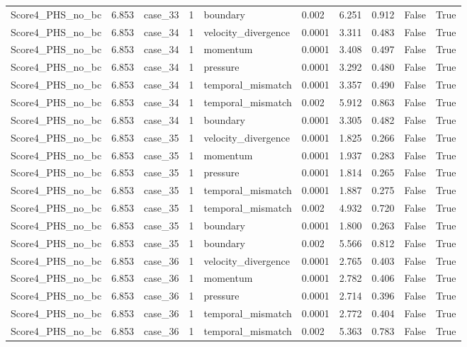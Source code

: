 \begin{longtable}{llllllllll}
Score4\_PHS\_no\_bc & 6.853 & case\_33 & 1 & boundary & 0.002 & 6.251 & 0.912 & False & True \\
Score4\_PHS\_no\_bc & 6.853 & case\_34 & 1 & velocity\_divergence & 0.0001 & 3.311 & 0.483 & False & True \\
Score4\_PHS\_no\_bc & 6.853 & case\_34 & 1 & momentum & 0.0001 & 3.408 & 0.497 & False & True \\
Score4\_PHS\_no\_bc & 6.853 & case\_34 & 1 & pressure & 0.0001 & 3.292 & 0.480 & False & True \\
Score4\_PHS\_no\_bc & 6.853 & case\_34 & 1 & temporal\_mismatch & 0.0001 & 3.357 & 0.490 & False & True \\
Score4\_PHS\_no\_bc & 6.853 & case\_34 & 1 & temporal\_mismatch & 0.002 & 5.912 & 0.863 & False & True \\
Score4\_PHS\_no\_bc & 6.853 & case\_34 & 1 & boundary & 0.0001 & 3.305 & 0.482 & False & True \\
Score4\_PHS\_no\_bc & 6.853 & case\_35 & 1 & velocity\_divergence & 0.0001 & 1.825 & 0.266 & False & True \\
Score4\_PHS\_no\_bc & 6.853 & case\_35 & 1 & momentum & 0.0001 & 1.937 & 0.283 & False & True \\
Score4\_PHS\_no\_bc & 6.853 & case\_35 & 1 & pressure & 0.0001 & 1.814 & 0.265 & False & True \\
Score4\_PHS\_no\_bc & 6.853 & case\_35 & 1 & temporal\_mismatch & 0.0001 & 1.887 & 0.275 & False & True \\
Score4\_PHS\_no\_bc & 6.853 & case\_35 & 1 & temporal\_mismatch & 0.002 & 4.932 & 0.720 & False & True \\
Score4\_PHS\_no\_bc & 6.853 & case\_35 & 1 & boundary & 0.0001 & 1.800 & 0.263 & False & True \\
Score4\_PHS\_no\_bc & 6.853 & case\_35 & 1 & boundary & 0.002 & 5.566 & 0.812 & False & True \\
Score4\_PHS\_no\_bc & 6.853 & case\_36 & 1 & velocity\_divergence & 0.0001 & 2.765 & 0.403 & False & True \\
Score4\_PHS\_no\_bc & 6.853 & case\_36 & 1 & momentum & 0.0001 & 2.782 & 0.406 & False & True \\
Score4\_PHS\_no\_bc & 6.853 & case\_36 & 1 & pressure & 0.0001 & 2.714 & 0.396 & False & True \\
Score4\_PHS\_no\_bc & 6.853 & case\_36 & 1 & temporal\_mismatch & 0.0001 & 2.772 & 0.404 & False & True \\
Score4\_PHS\_no\_bc & 6.853 & case\_36 & 1 & temporal\_mismatch & 0.002 & 5.363 & 0.783 & False & True \\

\end{longtable}

